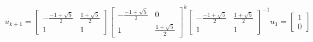 \documentclass[preview]{standalone}
\begin{document}
\begin{center}
$$u_{k + 1} = \begin{bmatrix} - \frac{-1 + \sqrt{5}}{2} &  \frac{1 + \sqrt{5}}{2} \\ 1 & 1 \end{bmatrix} \begin{bmatrix} - \frac{-1 + \sqrt{5}}{2} &  0 \\ 1 & \frac{1 + \sqrt{5}}{2} \end{bmatrix}^k \begin{bmatrix} - \frac{-1 + \sqrt{5}}{2} &  \frac{1 + \sqrt{5}}{2} \\ 1 & 1 \end{bmatrix}^{-1} u_1 = \begin{bmatrix} 1 \\ 0 \end{bmatrix}$$
\end{center}
\end{document}
